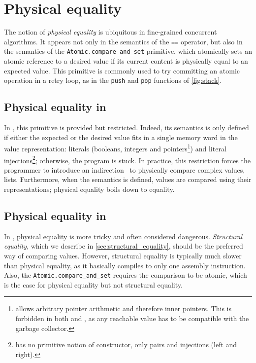 \section{Physical equality}
\label{sec:physical_equality}

The notion of \emph{physical equality} is ubiquitous in fine-grained concurrent algorithms.
It appears not only in the semantics of the \texttt{==} operator, but also in the semantics of the \texttt{Atomic.compare_and_set} primitive, which atomically sets an atomic reference to a desired value if its current content is physically equal to an expected value.
This primitive is commonly used to try committing an atomic operation in a retry loop, as in the \texttt{push} and \texttt{pop} functions of \cref{fig:stack}.

\subsection{Physical equality in \HeapLang}

In \HeapLang, this primitive is provided but restricted.
Indeed, its semantics is only defined if either the expected or the desired value fits in a single memory word in the \HeapLang value representation: literals (booleans, integers and pointers\footnote{\HeapLang allows arbitrary pointer arithmetic and therefore inner pointers. This is forbidden in both \OCaml and \ZooLang, as any reachable value has to be compatible with the garbage collector.}) and literal injections\footnote{\HeapLang has no primitive notion of constructor, only pairs and injections (left and right).}; otherwise, the program is stuck.
In practice, this restriction forces the programmer to introduce an indirection~\cite{iris/examples,DBLP:journals/pacmpl/JungLPRTDJ20,DBLP:conf/cpp/VindumB21} to physically compare complex values, \eg lists.
Furthermore, when the semantics is defined, values are compared using their \Rocq representations; physical equality boils down to \Rocq equality.

\subsection{Physical equality in \OCaml}

In \OCaml, physical equality is more tricky and often considered dangerous.
\emph{Structural equality}, which we describe in \cref{sec:structural_equality}, should be the preferred way of comparing values.
However, structural equality is typically much slower than physical equality, as it basically compiles to only one assembly instruction.
Also, the \texttt{Atomic.compare_and_set} requires the comparison to be atomic, which is the case for physical equality but not structural equality.

